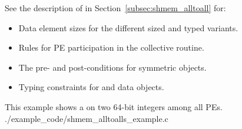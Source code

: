 \begin{apidefinition}
{{\color{Green}
    See the description of  in
    Section~\ref{subsec:shmem_alltoall} for:
    \begin{itemize}
    \item Data element sizes for the different sized and typed  variants.
    \item Rules for \ac{PE} participation in the collective routine.
    \item The pre- and post-conditions for symmetric objects.
    \item Typing constraints for \dest{} and \source{} data objects.
    \end{itemize}
}
    
} 




\begin{apiexamples}

\apicexample
    {This \CorCpp{} example shows a  on two 64-bit integers among
    all \acp{PE}.}
    {./example_code/shmem_alltoalls_example.c}
    {}

\end{apiexamples}

\end{apidefinition}

